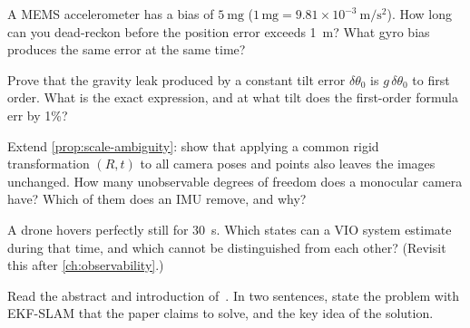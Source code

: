 \begin{exercises}
  \item A MEMS accelerometer has a bias of $5~\mathrm{mg}$ ($1\,\mathrm{mg} = 9.81\times10^{-3}~\mathrm{m/s^2}$).
        How long can you dead-reckon before the position error exceeds 1~m? What gyro bias produces
        the same error at the same time?
  \item Prove that the gravity leak produced by a constant tilt error $\delta\theta_0$ is
        $g\,\delta\theta_0$ to first order. What is the exact expression, and at what tilt does the
        first-order formula err by 1\%?
  \item Extend \cref{prop:scale-ambiguity}: show that applying a common rigid transformation
        $(R, t)$ to all camera poses and points also leaves the images unchanged. How many
        unobservable degrees of freedom does a monocular camera have? Which of them does an IMU
        remove, and why?
  \item A drone hovers perfectly still for 30~s. Which states can a VIO system estimate during that
        time, and which cannot be distinguished from each other? (Revisit this after
        \cref{ch:observability}.)
  \item Read the abstract and introduction of~\cite{mourikis2007msckf}. In two sentences, state the
        problem with EKF-SLAM that the paper claims to solve, and the key idea of the solution.
\end{exercises}

